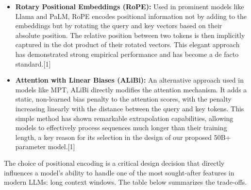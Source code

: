 \documentclass[12pt, a4paper]{article}
\begin{document}
\begin{itemize}
    \item \textbf{Rotary Positional Embeddings (RoPE):} Used in prominent models like Llama and PaLM, RoPE encodes positional information not by adding to the embeddings but by rotating the query and key vectors based on their absolute position. The relative position between two tokens is then implicitly captured in the dot product of their rotated vectors. This elegant approach has demonstrated strong empirical performance and has become a de facto standard.[1]
    \item \textbf{Attention with Linear Biases (ALiBi):} An alternative approach used in models like MPT, ALiBi directly modifies the attention mechanism. It adds a static, non-learned bias penalty to the attention scores, with the penalty increasing linearly with the distance between the query and key tokens. This simple method has shown remarkable extrapolation capabilities, allowing models to effectively process sequences much longer than their training length, a key reason for its selection in the design of our proposed 50B+ parameter model.[1]
\end{itemize}

The choice of positional encoding is a critical design decision that directly influences a model's ability to handle one of the most sought-after features in modern LLMs: long context windows. The table below summarizes the trade-offs.

\begin{table}[h!]
\centering
\caption{Comparison of Positional Encoding Methods}
\label{tab:pos_enc}
\end{table}
\end{document}
